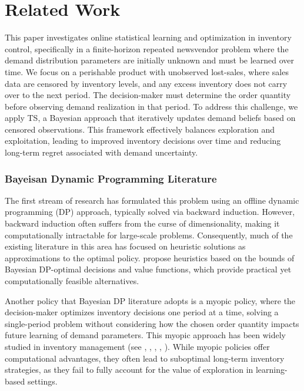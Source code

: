 \section{Related Work}
\label{sec:related work}

This paper investigates online statistical learning and optimization in inventory control, specifically in a finite-horizon repeated newsvendor problem where the demand distribution parameters are initially unknown and must be learned over time. We focus on a perishable product with unobserved lost-sales, where sales data are censored by inventory levels, and any excess inventory does not carry over to the next period. The decision-maker must determine the order quantity before observing demand realization in that period. To address this challenge, we apply TS, a Bayesian approach that iteratively updates demand beliefs based on censored observations. This framework effectively balances exploration and exploitation, leading to improved inventory decisions over time and reducing long-term regret associated with demand uncertainty.
\subsubsection{Bayeisan Dynamic Programming Literature}
The first stream of research has formulated this problem using an offline dynamic programming (DP) approach, typically solved via backward induction. However, backward induction often suffers from the curse of dimensionality, making it computationally intractable for large-scale problems. %
Consequently, much of the existing literature in this area has focused on heuristic solutions as approximations to the optimal policy. \cite{chen2010bounds} propose heuristics based on the bounds of Bayesian DP-optimal decisions and value functions, which provide practical yet computationally feasible alternatives.

Another policy that Bayesian DP literature adopts is a myopic policy, where the decision-maker optimizes inventory decisions one period at a time, solving a single-period problem without considering how the chosen order quantity impacts future learning of demand parameters. This myopic approach has been widely studied in inventory management (see \cite{kamath2002bayesian}, \cite{dehoratius2008retail}, \cite{bisi2011censored}, \cite{besbes2022exploration}, \cite{chuang2023bayesian}). While myopic policies offer computational advantages, they often lead to suboptimal long-term inventory strategies, as they fail to fully account for the value of exploration in learning-based settings.



